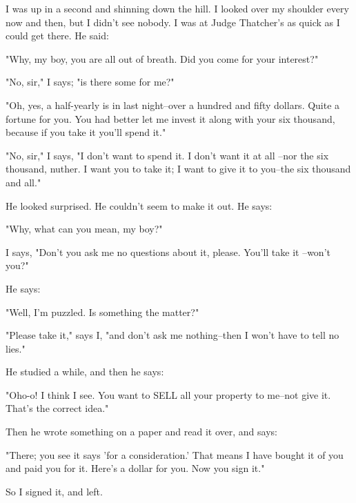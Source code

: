 I was up in a second and shinning down the hill.  I looked over my
shoulder every now and then, but I didn't see nobody.  I was at Judge
Thatcher's as quick as I could get there.  He said:

"Why, my boy, you are all out of breath.  Did you come for your
interest?"

"No, sir," I says; "is there some for me?"

"Oh, yes, a half-yearly is in last night--over a hundred and fifty
dollars.  Quite a fortune for you.  You had better let me invest it along
with your six thousand, because if you take it you'll spend it."

"No, sir," I says, "I don't want to spend it.  I don't want it at all
--nor the six thousand, nuther.  I want you to take it; I want to give it
to you--the six thousand and all."

He looked surprised.  He couldn't seem to make it out.  He says:

"Why, what can you mean, my boy?"

I says, "Don't you ask me no questions about it, please.  You'll take it
--won't you?"

He says:

"Well, I'm puzzled.  Is something the matter?"

"Please take it," says I, "and don't ask me nothing--then I won't have to
tell no lies."

He studied a while, and then he says:

"Oho-o!  I think I see.  You want to SELL all your property to me--not
give it.  That's the correct idea."

Then he wrote something on a paper and read it over, and says:

"There; you see it says 'for a consideration.'  That means I have bought
it of you and paid you for it.  Here's a dollar for you.  Now you sign
it."

So I signed it, and left.

